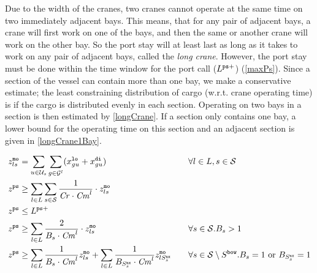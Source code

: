 Due to the width of the cranes, two cranes cannot operate at the same time on two immediately adjacent bays. This means, that for any pair of adjacent bays, a crane will first work on one of the bays, and then the same or another crane will work on the other bay. So the port stay will at least last as long as it takes to work on any pair of adjacent bays, called the \emph{long crane}. However, the port stay must be done within the time window for the port call ($L^{\texttt{ps}+}$) (\ref{maxPs}). Since a section of the vessel can contain more than one bay, we make a conservative estimate; the least constraining distribution of cargo (w.r.t. crane operating time) is if the cargo is distributed evenly in each section. Operating on two bays in a section is then estimated by \eqref{longCrane}. If a section only contains one bay, a lower bound for the operating time on this section and an adjacent section is given in \eqref{longCrane1Bay}.

\begin{alignat}{4}
\label{defMoves}
&z^\ttt{mo}_{ls} = \sum_{u\in \mc{U}_{s}}\sum_{g\in \mc{G}^l}(x^\ttt{lo}_{gu} + x^\ttt{di}_{gu}) 
																						&&\forall l\in L, s\in \mc{S}\\
\label{minPortStay}
&z^{\ttt{ps}} \geq \sum_{l\in L}\sum_{s\in\mc{S}} \frac{1}{\mi{Cr}\cdot \mi{Cm}^{l}}\cdot z^\ttt{mo}_{ls} \\
%
\label{maxPs}
& z^\ttt{ps}\leq L^{\ttt{ps}+}\\
%																							
\label{longCrane}
&z^{\ttt{ps}} \geq \sum_{l\in L}\frac{2}{B_{s}\cdot \mi{Cm}^{l}}\cdot z^\ttt{mo}_{ls}	&& \forall s\in\mc{S}. B_s > 1\\
%
\label{longCrane1Bay}
&z^\ttt{ps} \geq \sum_{l\in L}\frac{1}{B_s\cdot \mi{Cm}^l} z^\ttt{mo}_{ls} + \sum_{l\in L}\frac{1}{B_{S^\ttt{nx}_s}\cdot \mi{Cm}^{l}} z^\ttt{mo}_{lS^\ttt{nx}_s}\quad	
																						&& \forall s\in\mc{S}\setminus S^\ttt{bow}. B_s = 1 \text{ or } B_{S^\ttt{nx}_s} = 1
\end{alignat}

